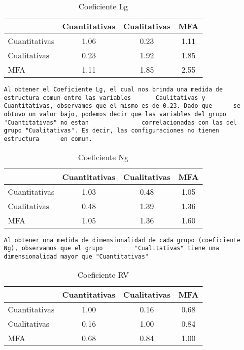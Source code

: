 \documentclass[
]{article}
\begin{document}
\begin{table}[H]

\caption{\label{tab:unnamed-chunk-10}Coeficiente Lg}
\centering
\fontsize{10}{12}\selectfont
\begin{tabular}[t]{l|c|c|c}
\hline
  & Cuantitativas & Cualitativas & MFA\\
\hline
Cuantitativas & 1.06 & 0.23 & 1.11\\
\hline
Cualitativas & 0.23 & 1.92 & 1.85\\
\hline
MFA & 1.11 & 1.85 & 2.55\\
\hline
\end{tabular}
\end{table}

\begin{verbatim}
Al obtener el Coeficiente Lg, el cual nos brinda una medida de estructura comun entre las variables       Caulitativas y Cuantitativas, observamos que el mismo es de 0.23. Dado que      se obtuvo un valor bajo, podemos decir que las variables del grupo "Cuantitativas" no estan               correlacionadas con las del grupo "Cualitativas". Es decir, las configuraciones no tienen estructura      en comun.
\end{verbatim}

\begin{table}[H]

\caption{\label{tab:unnamed-chunk-11}Coeficiente Ng}
\centering
\fontsize{10}{12}\selectfont
\begin{tabular}[t]{l|c|c|c}
\hline
  & Cuantitativas & Cualitativas & MFA\\
\hline
Cuantitativas & 1.03 & 0.48 & 1.05\\
\hline
Cualitativas & 0.48 & 1.39 & 1.36\\
\hline
MFA & 1.05 & 1.36 & 1.60\\
\hline
\end{tabular}
\end{table}

\begin{verbatim}
Al obtener una medida de dimensionalidad de cada grupo (coeficiente Ng), observamos que el grupo         "Cualitativas" tiene una dimensionalidad mayor que "Cuantitativas"
\end{verbatim}

\begin{table}[H]

\caption{\label{tab:unnamed-chunk-12}Coeficiente RV}
\centering
\fontsize{10}{12}\selectfont
\begin{tabular}[t]{l|c|c|c}
\hline
  & Cuantitativas & Cualitativas & MFA\\
\hline
Cuantitativas & 1.00 & 0.16 & 0.68\\
\hline
Cualitativas & 0.16 & 1.00 & 0.84\\
\hline
MFA & 0.68 & 0.84 & 1.00\\
\hline
\end{tabular}
\end{table}
\end{document}
